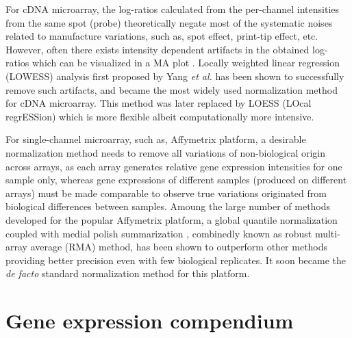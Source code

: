 For cDNA microarray, the log-ratios calculated from the per-channel intensities
from the same spot (probe) theoretically negate most of the systematic noises
related to manufacture variations, such as, spot effect, print-tip effect, etc.
%
However, often there exists intensity dependent artifacts in the obtained
log-ratios which can be visualized in a MA plot \cite{Yang2002}.
%
Locally weighted linear regression (LOWESS) analysis \cite{Cleveland1979} first
proposed by Yang \textit{et al.} \cite{Yang2002} has been shown to successfully
remove such artifacts, and became the most widely used normalization method for
cDNA microarray.
%
This method was later replaced by LOESS (LOcal regrESSion) which is more
flexible albeit computationally more intensive.
%

For single-channel microarray, such as, Affymetrix platform, a desirable
normalization method needs to remove all variations of non-biological origin
across arrays, as each array generates relative gene expression intensities for
one sample only, whereas gene expressions of different samples (produced on
different arrays) must be made comparable to observe true variations originated
from biological differences between samples.
%
Amoung the large number of methods developed for the popular Affymetrix
platform, a global quantile normalization \cite{Bolstad2003,Irizarry2003a}
coupled with medial polish summarization \cite{Irizarry2003}, combinedly known
as robust multi-array average (RMA) method, has been shown to outperform other
methods \cite{Irizarry2006} providing better precision even with few biological
replicates.  It soon became the \textit{de facto} standard normalization
method for this platform.
%








\section{Gene expression compendium}
%


%


